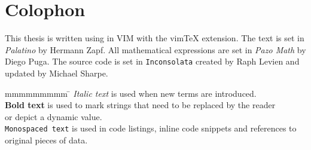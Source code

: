 
\vspace*{\fill}

\section*{Colophon}

This thesis is written using \LaTeXe{} in VIM with the vim\TeX{} extension. The
text is set in \textit{Palatino} by Hermann Zapf. All mathematical expressions
are set in \textit{Pazo Math} by Diego Puga. The source code is set in
\texttt{Inconsolata} created by Raph Levien and updated by Michael
Sharpe.

\begin{tabbing}
  mmmmmmmmm     \= \kill
  \textit{Italic text}     \> is used when new terms are introduced.\\
  \textbf{Bold text}       \> is used to mark strings that need to be replaced by the reader\\
                           \> or depict a dynamic value.\\
  \texttt{Monospaced text} \> is used in code listings, inline code snippets and references to\\
                           \> original pieces of data.
\end{tabbing}

